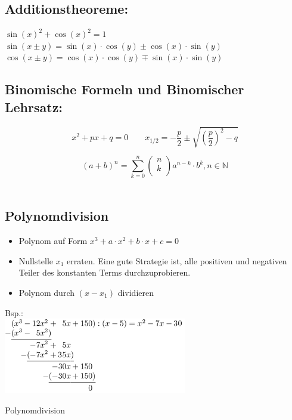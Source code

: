 \subsection{Additionstheoreme:}\label{subs:Additionstheoreme}
$\sin(x)^2 + \cos(x)^2 = 1$\\

$\sin(x\pm y) = \sin(x)\cdot \cos(y) \pm \cos(x)\cdot \sin(y)$\\

$\cos(x\pm y) = \cos(x)\cdot \cos(y) \mp \sin(x)\cdot \sin(y)$\\


\subsection{Binomische Formeln und Binomischer Lehrsatz:}\label{subs:quadr_lösungsformel}
\begin{equation}
	x^2+px+q=0 \qquad x_{1/2}=-\frac{p}{2} \pm \sqrt{\left(\frac{p}{2}\right)^2-q}
\end{equation}\label{Quadratische Lösungsformel}

\begin{equation}
	{(a+b)}^n = \sum\limits_{k=0}^n \left ( \begin{matrix}
		n\\
		k\\
	\end{matrix} \right ) a^{n-k}\cdot b^k ,n \in \mathbb{N}
\end{equation}\label{eq:Binomischer_Lehrsatz}
\ \\



\subsection{Polynomdivision}
\begin{itemize}
	\item Polynom auf Form $x^3 + a\cdot x^2 + b \cdot x + c = 0$
	\item Nullstelle $x_1$ erraten. Eine gute Strategie ist, alle positiven
	und negativen Teiler des konstanten Terms durchzuprobieren.
	\item Polynom durch $(x-x_1)$ dividieren
\end{itemize}

Bsp.:\\

\captionsetup{type=figure}
\includegraphics[width=0.6\textwidth]{../pictures/Polynomdivision.png}
\caption{Polynomdivision}\label{fig:Polynomdivision}

